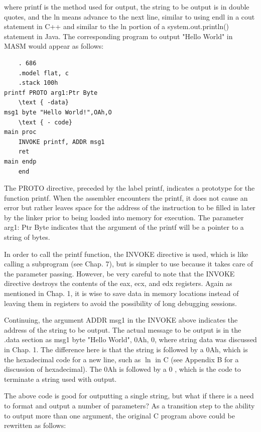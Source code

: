 \documentclass[10pt]{book}
\begin{document}
where printf is the method used for output, the string to be output is in double quotes, and the ln means advance to the next line, similar to using endl in a cout statement in C++ and similar to the ln portion of a system.out.println() statement in Java. The corresponding program to output "Hello World" in MASM would appear as follows:

\begin{verbatim}
    . 686
    .model flat, c
    .stack 100h
printf PROTO arg1:Ptr Byte
    \text { -data}
msg1 byte "Hello World!",OAh,O
    \text { - code}
main proc
    INVOKE printf, ADDR msg1
    ret
main endp
    end
\end{verbatim}

The PROTO directive, preceded by the label printf, indicates a prototype for the function printf. When the assembler encounters the printf, it does not cause an error but rather leaves space for the address of the instruction to be filled in later by the linker prior to being loaded into memory for execution. The parameter arg1: Ptr Byte indicates that the argument of the printf will be a pointer to a string of bytes.

In order to call the printf function, the INVOKE directive is used, which is like calling a subprogram (see Chap. 7), but is simpler to use because it takes care of the parameter passing. However, be very careful to note that the INVOKE directive destroys the contents of the eax, ecx, and edx registers. Again as mentioned in Chap. 1, it is wise to save data in memory locations instead of leaving them in registers to avoid the possibility of long debugging sessions.

Continuing, the argument ADDR msg1 in the INVOKE above indicates the address of the string to be output. The actual message to be output is in the .data section as msg1 byte "Hello World", 0Ah, 0, where string data was discussed in Chap. 1. The difference here is that the string is followed by a 0Ah, which is the hexadecimal code for a new line, such as $\ln$ in C (see Appendix B for a discussion of hexadecimal). The 0Ah is followed by a 0 , which is the code to terminate a string used with output.

The above code is good for outputting a single string, but what if there is a need to format and output a number of parameters? As a transition step to the ability to output more than one argument, the original C program above could be rewritten as follows:
\end{document}
